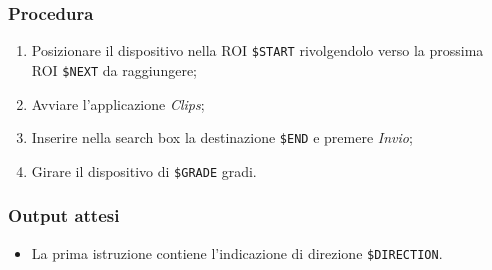\documentclass[../Sperimentazione.tex]{subfiles}
\begin{document}
	\subsubsection{Procedura}
		\begin{enumerate}
		\item Posizionare il dispositivo nella ROI \verb|$START| rivolgendolo verso la prossima ROI  \verb|$NEXT| da raggiungere;
		\item Avviare l'applicazione \textit{Clips};
		\item Inserire nella search box la destinazione  \verb|$END| e premere \textit{Invio};
		\item Girare il dispositivo di  \verb|$GRADE| gradi.
		\end{enumerate}
		
	\subsubsection{Output attesi}
		\begin{itemize}
			\item La prima istruzione contiene l'indicazione di direzione  \verb|$DIRECTION|.
		\end{itemize}

	
	
		
	
\end{document}
